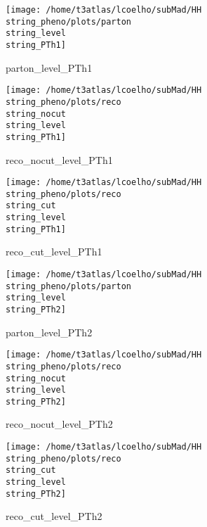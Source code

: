 \documentclass[a4paper,onecolumn,final,11pt]{article}
\begin{document}
\begin{figure}[H] 
\centering 
\begin{minipage}{.32\textwidth} 
        \centering 
        \hspace{0cm} 
        \texttt{[image: /home/t3atlas/lcoelho/subMad/HH\\string\_pheno/plots/parton\\string\_level\\string\_PTh1]} 
        \caption{parton_level_PTh1} 
\end{minipage} 
\hfill 
\begin{minipage}{.32\textwidth} 
        \centering 
        \hspace{0cm} 
    \texttt{[image: /home/t3atlas/lcoelho/subMad/HH\\string\_pheno/plots/reco\\string\_nocut\\string\_level\\string\_PTh1]} 
        \caption{reco_nocut_level_PTh1} 
\end{minipage} 
\hfill 
\begin{minipage}{.32\textwidth} 
        \centering 
        \hspace{0cm} 
    \texttt{[image: /home/t3atlas/lcoelho/subMad/HH\\string\_pheno/plots/reco\\string\_cut\\string\_level\\string\_PTh1]} 
        \caption{reco_cut_level_PTh1} 
\end{minipage} 
\end{figure} 
 
\begin{figure}[H] 
\centering 
\begin{minipage}{.32\textwidth} 
        \centering 
        \hspace{0cm} 
        \texttt{[image: /home/t3atlas/lcoelho/subMad/HH\\string\_pheno/plots/parton\\string\_level\\string\_PTh2]} 
        \caption{parton_level_PTh2} 
\end{minipage} 
\hfill 
\begin{minipage}{.32\textwidth} 
        \centering 
        \hspace{0cm} 
    \texttt{[image: /home/t3atlas/lcoelho/subMad/HH\\string\_pheno/plots/reco\\string\_nocut\\string\_level\\string\_PTh2]} 
        \caption{reco_nocut_level_PTh2} 
\end{minipage} 
\hfill 
\begin{minipage}{.32\textwidth} 
        \centering 
        \hspace{0cm} 
    \texttt{[image: /home/t3atlas/lcoelho/subMad/HH\\string\_pheno/plots/reco\\string\_cut\\string\_level\\string\_PTh2]} 
        \caption{reco_cut_level_PTh2} 
\end{minipage} 
\end{figure} 
 
\end{document}
